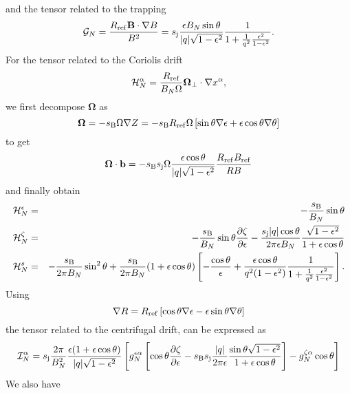 and the tensor related to the trapping
\begin{equation}
 \mathcal{G}_N = \frac{R_{\mathrm{ref}}\mathbf{B}\cdot\nabla B}{B^2} = s_{\mathrm{j}}\frac{\epsilon B_N \sin \theta}{|q|\sqrt{1-\epsilon^2}}\frac{1}{1+\frac{1}{q^2}\frac{\epsilon^2}{1-\epsilon^2}}.
\end{equation}
For the tensor related to the Coriolis drift
\begin{equation}
 \mathcal{H}^\alpha_N=\frac{R_{\mathrm{ref}}}{B_N\Omega}\mathbf{\Omega}_\perp\cdot\nabla x^\alpha,
\end{equation}
we first decompose $\mathbf{\Omega}$ as
\begin{equation}
 \mathbf{\Omega} = -s_{\mathrm{B}}\Omega\nabla Z = -s_{\mathrm{B}}R_{\mathrm{ref}}\Omega\left[ \sin\theta \nabla \epsilon + \epsilon \cos \theta \nabla \theta\right]
\end{equation}
to get
\begin{equation}
 \mathbf{\Omega}\cdot\mathbf{b} = -s_{\mathrm{B}}s_{\mathrm{j}}\Omega\frac{\epsilon\cos\theta}{|q|\sqrt{1-\epsilon^2}}\frac{R_{\mathrm{ref}}B_{\mathrm{ref}}}{RB} 
\end{equation}
and finally obtain
\begin{eqnarray}
 \mathcal{H}^\epsilon_N &=& -\frac{s_{\mathrm{B}}}{B_N}\sin\theta \\
 \mathcal{H}^\zeta_N &=& -\frac{s_{\mathrm{B}}}{B_N}\sin\theta\frac{\partial \zeta}{\partial \epsilon} -
                         \frac{s_{\mathrm{j}}|q|\cos\theta}{2\pi\epsilon B_N}\frac{\sqrt{1-\epsilon^2}}{1+\epsilon\cos\theta}\\
 \mathcal{H}^s_N &=& -\frac{s_{\mathrm{B}}}{2\pi B_N}\sin^2\theta + \frac{s_{\mathrm{B}}}{2\pi B_N}(1+\epsilon\cos\theta)\left[ -\frac{\cos\theta}{\epsilon} + \frac{\epsilon\cos\theta}{q^2(1-\epsilon^2)}
\frac{1}{1+\frac{1}{q^2}\frac{\epsilon^2}{1-\epsilon^2}}\right].
\end{eqnarray}
Using
\begin{equation}
 \nabla R = R_{\mathrm{ref}} \left[\cos\theta \nabla \epsilon -\epsilon\sin\theta\nabla\theta \right] 
\end{equation}
the tensor related to the centrifugal drift, can be expressed as
\begin{equation}
 \mathcal{I}^\alpha_N = s_{\mathrm{j}}\frac{2\pi}{B_N^2}\frac{\epsilon(1+\epsilon\cos\theta)}{|q|\sqrt{1-\epsilon^2}}\left[g^{\epsilon\alpha}_N\left[\cos\theta\frac{\partial \zeta}{\partial \epsilon} -
s_{\mathrm{B}}s_{\mathrm{j}}\frac{|q|}{2\pi\epsilon}\frac{\sin\theta\sqrt{1-\epsilon^2}}{1+\epsilon\cos\theta}\right] -g^{\zeta\alpha}_N\cos\theta\right]
\end{equation}
We also have
